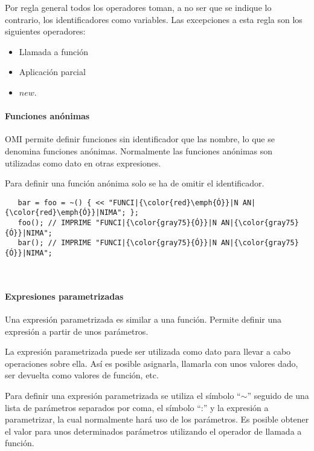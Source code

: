 Por regla general todos los operadores toman, a no ser que se indique lo contrario, 
los identificadores como variables. Las excepciones a esta regla son los 
siguientes operadores:

\begin {itemize}
   \item Llamada a función 
   \item Aplicación parcial
   \item $new$.
\end{itemize}

\paragraph{Funciones anónimas}
OMI permite definir funciones sin identificador que las nombre, lo que se denomina funciones 
anónimas. Normalmente las funciones anónimas son utilizadas
como dato en otras expresiones. 

Para definir una función anónima solo se ha de omitir el identificador. \\


\begin{lstlisting} 
   bar = foo = ~() { << "FUNCI|{\color{red}\emph{Ó}}|N AN|{\color{red}\emph{Ó}}|NIMA"; };
   foo(); // IMPRIME "FUNCI|{\color{gray75}{Ó}}|N AN|{\color{gray75}{Ó}}|NIMA"; 
   bar(); // IMPRIME "FUNCI|{\color{gray75}{Ó}}|N AN|{\color{gray75}{Ó}}|NIMA"; 
\end{lstlisting}
\hfill\\ 


\paragraph{Expresiones parametrizadas}
Una expresión parametrizada es similar a una función. Permite definir una expresión a partir de unos parámetros. 

La expresión parametrizada puede ser utilizada como dato para llevar a cabo operaciones sobre ella. Así es posible asignarla, 
llamarla con unos valores dado, ser devuelta como valores de función, etc.

Para definir una expresión parametrizada se utiliza el símbolo ``$\sim$'' seguido de una lista de parámetros separados por coma, el símbolo ``:'' y la expresión 
a parametrizar, la cual normalmente hará uso de los parámetros. Es posible obtener el valor para unos determinados parámetros utilizando 
el operador de llamada a función. \\

